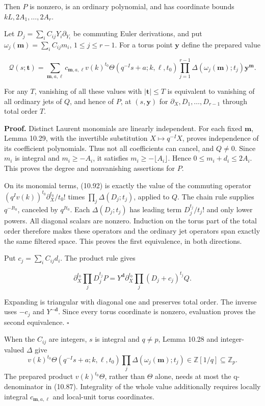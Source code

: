 \documentclass[
  11pt,
  a4paper,
]{article}
\begin{document}
Then \(P\) is nonzero, is an ordinary polynomial, and has coordinate
bounds \(kL,2A_1,\ldots,2A_r\).

Let \(D_j=\sum_i C_{ij}Y_i\partial_{Y_i}\) be commuting Euler
derivations, and put \(\omega_j(\boldsymbol m)=\sum_iC_{ij}m_i\),
\(1\le j\le r-1\). For a torus point \(\boldsymbol y\) define the
prepared value

\[
\mathcal Q(s;\boldsymbol t)=
\sum_{\boldsymbol m,a,\ell}c_{\boldsymbol m,a,\ell}
v(k)^{t_0}\Theta(q^{-I}s+a;k,\ell,t_0)
\prod_{j=1}^{r-1}\Delta(\omega_j(\boldsymbol m);t_j)
\boldsymbol y^{\boldsymbol m}.
\tag{10.92}
\]

For any \(T\), vanishing of all these values with
\(|\boldsymbol t|\le T\) is equivalent to vanishing of all ordinary jets
of \(Q\), and hence of \(P\), at \((s,\boldsymbol y)\) for
\(\partial_X,D_1,\ldots,D_{r-1}\) through total order \(T\).

\textbf{Proof.} Distinct Laurent monomials are linearly independent. For
each fixed \(\boldsymbol m\), Lemma 10.29, with the invertible
substitution \(X\mapsto q^{-I}X\), proves independence of its
coefficient polynomials. Thus not all coefficients can cancel, and
\(Q\ne0\). Since \(m_i\) is integral and \(m_i\ge-A_i\), it satisfies
\(m_i\ge-\lfloor A_i\rfloor\). Hence \(0\le m_i+d_i\le2A_i\). This
proves the degree and nonvanishing assertions for \(P\).

On its monomial terms, (10.92) is exactly the value of the commuting
operator \((q^Iv(k))^{t_0}\partial_X^{t_0}/t_0!\) times
\(\prod_j\Delta(D_j;t_j)\), applied to \(Q\). The chain rule supplies
\(q^{-It_0}\), canceled by \(q^{It_0}\). Each \(\Delta(D_j;t_j)\) has
leading term \(D_j^{t_j}/t_j!\) and only lower powers. All diagonal
scalars are nonzero. Induction on the torus part of the total order
therefore makes these operators and the ordinary jet operators span
exactly the same filtered space. This proves the first equivalence, in
both directions.

Put \(c_j=\sum_iC_{ij}d_i\). The product rule gives

\[
\partial_X^{t_0}\prod_jD_j^{t_j}P
=Y^{\boldsymbol d}\partial_X^{t_0}
\prod_j(D_j+c_j)^{t_j}Q.
\tag{10.93}
\]

Expanding is triangular with diagonal one and preserves total order. The
inverse uses \(-c_j\) and \(Y^{-\boldsymbol d}\). Since every torus
coordinate is nonzero, evaluation proves the second equivalence.
\(\square\)

When the \(C_{ij}\) are integers, \(s\) is integral and \(q\ne p\),
Lemma 10.28 and integer-valued \(\Delta\) give \[
v(k)^{t_0}\Theta(q^{-I}s+a;k,\ell,t_0)
\prod_j\Delta(\omega_j(\boldsymbol m);t_j)
\in\mathbb Z[1/q]\subseteq\mathbb Z_p.
\] The prepared product \(v(k)^{t_0}\Theta\), rather than \(\Theta\)
alone, needs at most the q-denominator in (10.87). Integrality of the
whole value additionally requires locally integral
\(c_{\boldsymbol m,a,\ell}\) and local-unit torus coordinates.
\end{document}
